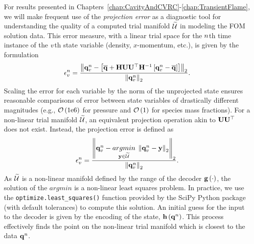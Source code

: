 For results presented in Chapters~\ref{chap:CavityAndCVRC}-\ref{chap:TransientFlame}, we will make frequent use of the \textit{projection error} as a diagnostic tool for understanding the quality of a computed trial manifold $\trialSpace$ in modeling the FOM solution data. This error measure, with a linear trial space for the $n$th time instance of the $v$th state variable (density, $x$-momentum, etc.), is given by the formulation
%
\begin{equation}\label{eq:projErrLinear}
    \errVecVar^\timeIdx = \frac{\left\Vert \stateVecVar^\timeIdx - \left[\stateVecCent + \scaleMat \basisMat \basisMat^\top \scaleMatInv \left[ \stateVecVar^\timeIdx - \stateVecCent \right] \right] \right\Vert_2}{\left\Vert \stateVecVar^\timeIdx \right\Vert_2}.
\end{equation}
%
Scaling the error for each variable by the norm of the unprojected state ensures reasonable comparisons of error between state variables of drastically different magnitudes (e.g., $\mathcal{O}\left(1\text{e}6\right)$ for pressure and $\mathcal{O}\left(1\right)$ for species mass fractions). For a non-linear trial manifold $\trialSpace$, an equivalent projection operation akin to $\basisMat \basisMat^\top$ does not exist. Instead, the projection error is defined as
%
\begin{equation}\label{eq:projErrNonlin}
    \errVecVar^\timeIdx = \frac{\left\Vert \stateVecVar^\timeIdx - \argmin{\dummyVec \in \trialSpace} \left\Vert \stateVecVar^\timeIdx - \dummyVec \right\Vert_2 \right\Vert_2}{\left\Vert \stateVecVar^\timeIdx \right\Vert_2}.
\end{equation}
%
As $\trialSpace$ is a non-linear manifold defined by the range of the decoder $\mathbf{g} \left(\cdot\right)$, the solution of the $argmin$ is a non-linear least squares problem. In practice, we use the \verb|optimize.least_squares()| function provided by the SciPy Python package (with default tolerances) to compute this solution. An initial guess for the input to the decoder is given by the encoding of the state, $\mathbf{h} \left(\mathbf{q}^{n}\right)$. This process effectively finds the point on the non-linear trial manifold which is closest to the data $\mathbf{q}^{n}$.

